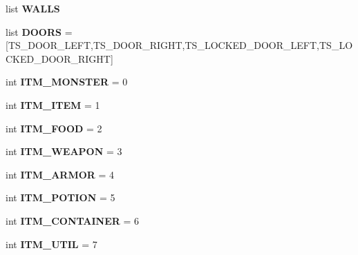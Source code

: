 \begin{DoxyCompactItemize}
\item 
list {\bfseries W\+A\+L\+L\+S}
\item 
\hypertarget{namespaceconstants_a7e7457b1e603639fd965e0314e61ccff}{}list {\bfseries D\+O\+O\+R\+S} = \mbox{[}T\+S\+\_\+\+D\+O\+O\+R\+\_\+\+L\+E\+F\+T,T\+S\+\_\+\+D\+O\+O\+R\+\_\+\+R\+I\+G\+H\+T,T\+S\+\_\+\+L\+O\+C\+K\+E\+D\+\_\+\+D\+O\+O\+R\+\_\+\+L\+E\+F\+T,T\+S\+\_\+\+L\+O\+C\+K\+E\+D\+\_\+\+D\+O\+O\+R\+\_\+\+R\+I\+G\+H\+T\mbox{]}\label{namespaceconstants_a7e7457b1e603639fd965e0314e61ccff}

\item 
\hypertarget{namespaceconstants_a93a93ad609aa8f14120eecd1492a66ec}{}int {\bfseries I\+T\+M\+\_\+\+M\+O\+N\+S\+T\+E\+R} = 0\label{namespaceconstants_a93a93ad609aa8f14120eecd1492a66ec}

\item 
\hypertarget{namespaceconstants_ae8796e8f36e12c11bdeb92a6e4e982f3}{}int {\bfseries I\+T\+M\+\_\+\+I\+T\+E\+M} = 1\label{namespaceconstants_ae8796e8f36e12c11bdeb92a6e4e982f3}

\item 
\hypertarget{namespaceconstants_ae3112adea9552297dd8ebe35ecfa0c2a}{}int {\bfseries I\+T\+M\+\_\+\+F\+O\+O\+D} = 2\label{namespaceconstants_ae3112adea9552297dd8ebe35ecfa0c2a}

\item 
\hypertarget{namespaceconstants_a188df7c22bb1f369b8fb056a7f979efb}{}int {\bfseries I\+T\+M\+\_\+\+W\+E\+A\+P\+O\+N} = 3\label{namespaceconstants_a188df7c22bb1f369b8fb056a7f979efb}

\item 
\hypertarget{namespaceconstants_ab19d774310e683a6674d5a1afd4c2073}{}int {\bfseries I\+T\+M\+\_\+\+A\+R\+M\+O\+R} = 4\label{namespaceconstants_ab19d774310e683a6674d5a1afd4c2073}

\item 
\hypertarget{namespaceconstants_acffc7f88343272e8aac072db181ce105}{}int {\bfseries I\+T\+M\+\_\+\+P\+O\+T\+I\+O\+N} = 5\label{namespaceconstants_acffc7f88343272e8aac072db181ce105}

\item 
\hypertarget{namespaceconstants_a8b33a844332201e898ad5b79424f076b}{}int {\bfseries I\+T\+M\+\_\+\+C\+O\+N\+T\+A\+I\+N\+E\+R} = 6\label{namespaceconstants_a8b33a844332201e898ad5b79424f076b}

\item 
\hypertarget{namespaceconstants_a11c357b9a819e84a45622df5d121eb47}{}int {\bfseries I\+T\+M\+\_\+\+U\+T\+I\+L} = 7\label{namespaceconstants_a11c357b9a819e84a45622df5d121eb47}


\end{DoxyCompactItemize}
